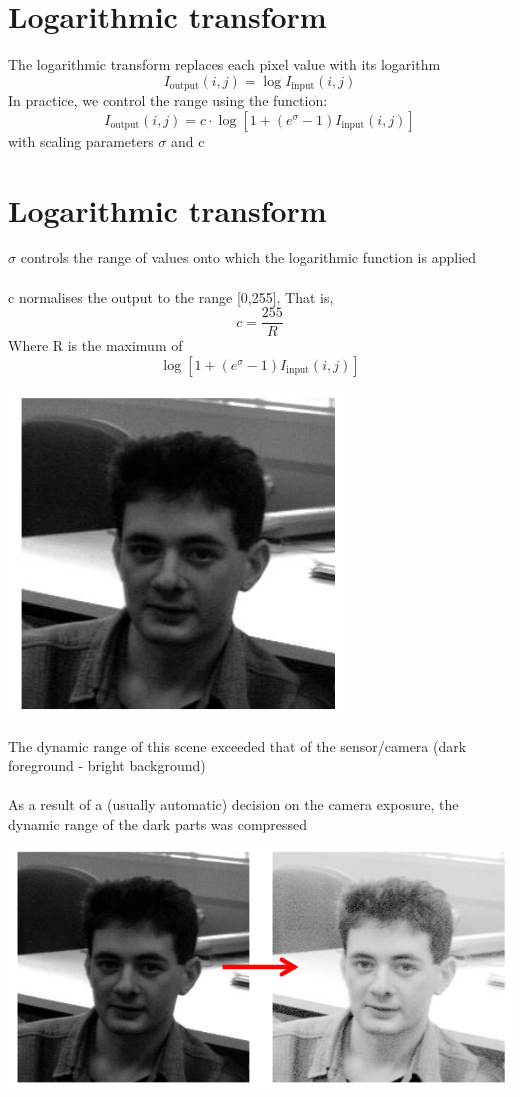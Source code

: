 \documentclass{article}[18pt]
\begin{document}
\section{Logarithmic transform}
The logarithmic transform replaces each pixel value with its logarithm
\[
I_{\text {output}}(i, j)=\log I_{\text {input}}(i, j)
\]
In practice, we control the range using the function:
\[
I_{\text {output}}(i, j)=c \cdot \log \left[1+\left(e^{\sigma}-1\right) I_{\text {input}}(i, j)\right]
\]
with scaling parameters $\sigma$ and c
\section{Logarithmic transform}
$\sigma$ controls the range of values onto which the logarithmic function is applied\\
\\
c normalises the output to the range [0,255]. That is,
$$c=\dfrac{255}{R}$$
Where R is the maximum of
$$\log \left[1+\left(e^{\sigma}-1\right) I_{\text {input}}(i, j)\right]$$
\begin{center}
	\includegraphics[scale=0.7]{log}
\end{center}
The dynamic range of this scene exceeded that of the sensor/camera (dark foreground - bright background)\\
\\
As a result of a (usually automatic) decision on the camera exposure, the dynamic range of the dark parts was compressed
\begin{center}
	\includegraphics[scale=0.7]{log1}
\end{center}
\end{document}
